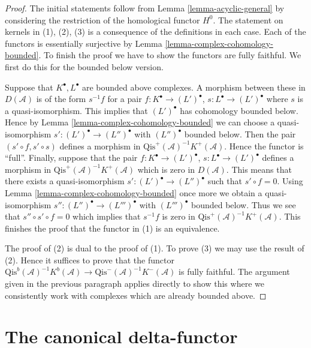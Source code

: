 \begin{proof}
The initial statements follow from
Lemma \ref{lemma-acyclic-general}
by considering the restriction of the homological functor $H^0$.
The statement on kernels in (1), (2), (3) is a consequence of the
definitions in each case.
Each of the functors is essentially surjective by
Lemma \ref{lemma-complex-cohomology-bounded}.
To finish the proof we have to show the functors are fully faithful.
We first do this for the bounded below version.

\medskip\noindent
Suppose that $K^\bullet, L^\bullet$ are bounded above complexes.
A morphism between these in $D(\mathcal{A})$ is of the form
$s^{-1}f$ for a pair
$f : K^\bullet \to (L')^\bullet$, $s : L^\bullet \to (L')^\bullet$
where $s$ is a quasi-isomorphism. This implies that $(L')^\bullet$
has cohomology bounded below. Hence by
Lemma \ref{lemma-complex-cohomology-bounded}
we can choose a quasi-isomorphism
$s' : (L')^\bullet \to (L'')^\bullet$
with $(L'')^\bullet$ bounded below. Then the pair $(s' \circ f, s' \circ s)$
defines a morphism in $\text{Qis}^{+}(\mathcal{A})^{-1}K^{+}(\mathcal{A})$.
Hence the functor is ``full''. Finally, suppose that the pair
$f : K^\bullet \to (L')^\bullet$, $s : L^\bullet \to (L')^\bullet$
defines a morphism in $\text{Qis}^{+}(\mathcal{A})^{-1}K^{+}(\mathcal{A})$
which is zero in $D(\mathcal{A})$. This means that there exists a
quasi-isomorphism $s' : (L')^\bullet \to (L'')^\bullet$
such that $s' \circ f = 0$. Using
Lemma \ref{lemma-complex-cohomology-bounded}
once more we obtain a quasi-isomorphism
$s'' : (L'')^\bullet \to (L''')^\bullet$
with $(L''')^\bullet$ bounded below.
Thus we see that $s'' \circ s' \circ f = 0$ which implies that
$s^{-1}f$ is zero in $\text{Qis}^{+}(\mathcal{A})^{-1}K^{+}(\mathcal{A})$.
This finishes the proof that the functor in (1) is an equivalence.

\medskip\noindent
The proof of (2) is dual to the proof of (1).
To prove (3) we may use the result of (2). Hence it suffices to
prove that the functor
$\text{Qis}^b(\mathcal{A})^{-1}K^b(\mathcal{A})
\to \text{Qis}^{-}(\mathcal{A})^{-1}K^{-}(\mathcal{A})$
is fully faithful. The argument given in the previous paragraph
applies directly to show this where we consistently work with complexes
which are already bounded above.
\end{proof}







\section{The canonical delta-functor}
\label{section-canonical-delta-functor}


